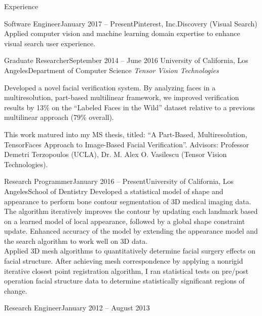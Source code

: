 \documentclass{resume}
\begin{document}
\vspace{0.5em}

\begin{component}{Experience}
    \begin{position}{Software Engineer}{January 2017 -- Present}{Pinterest, Inc.}{Discovery (Visual Search)}
    {Applied computer vision and machine learning domain expertise to enhance visual search user experience.}
  \end{position}
  
    \begin{position}{Graduate Researcher}{September 2014 -- June 2016}
        {University of California, Los Angeles}{Department of Computer Science}
    \emph{Tensor Vision Technologies}

    {Developed a novel facial verification system. 
By analyzing faces in a multiresolution, part-based multilinear framework, we improved verification results by 13\% on the ``Labeled Faces in the Wild'' dataset relative to a previous multilinear approach (79\% overall).

This work matured into my MS thesis, titled: ``A Part-Based, Multiresolution, TensorFaces Approach to Image-Based Facial Verification''.
Advisors: Professor Demetri Terzopoulos (UCLA), Dr. M. Alex O. Vasilescu (Tensor Vision Technologies).
}
    \end{position}

    \begin{position}{Research Programmer}{January 2016 -- Present}{University of California, Los Angeles}{School of Dentistry}
      {
Developed a statistical model of shape and appearance to perform bone contour segmentation of 3D medical imaging data.
The algorithm iteratively improves the contour by updating each landmark based on a learned model of local appearance, followed by a global shape constraint update.
Enhanced accuracy of the model by extending the appearance model and the search algorithm to work well on 3D data.
\\
Applied 3D mesh algorithms to quantitatively determine facial surgery effects on facial structure.
After achieving mesh correspondence by applying a nonrigid iterative closest point registration algorithm, I ran statistical tests on pre/post operation facial structure data to determine statistically significant regions of change.
}
      \end{position}


    \begin{position}{Research Engineer}{January 2012 -- August 2013}
        {}{}{}
    \end{position}


\end{component}
\end{document}

